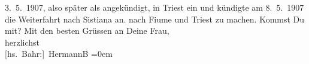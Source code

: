 \begin{ledgroupsized}[t]{13cm}
{{{                     3. 5. 1907, also später als angekündigt, in Triest ein und kündigte am 8. 5. 1907 die Weiterfahrt
                  nach Sistiana an.}}}\label{K_L01670_1h} nach Fiume und Triest zu machen.
               Kommst Du mit?\pend
           \pstart
           Mit den besten Grüssen an Deine Frau,{\\[\baselineskip]}herzlichst{\\[\baselineskip]}\spacefill\mbox{{[}hs. Bahr:{]} HermannB}\pend
           \leftskip=0em{}\endnumbering{}\end{ledgroupsized}  \newcommand{\dateiname}{L01670}\newcommand{\titel}{Hermann Bahr an Arthur Schnitzler, 26. 4. 1907}\newcommand{\editorInnen}{ Kurt Ifkovits,  Martin Anton Müller}
      